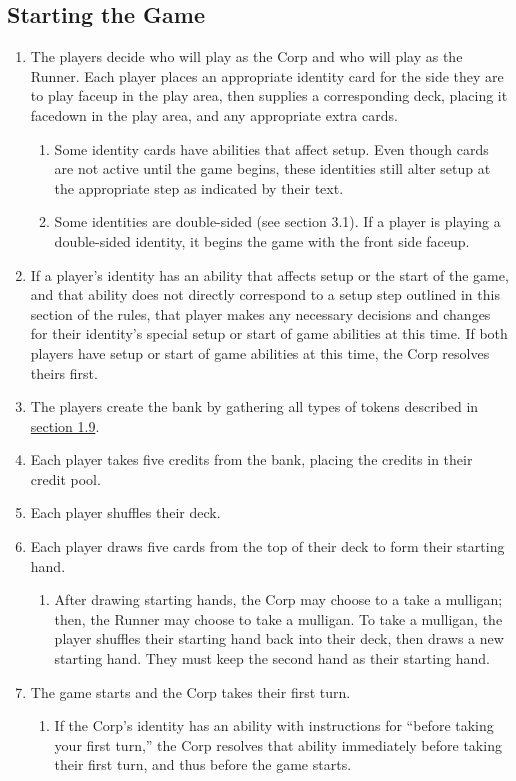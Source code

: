 \subsection{Starting the Game}
\begin{enumerate}
	\item The players decide who will play as the Corp and who will play as the Runner. Each player places an appropriate identity card for the side they are to play faceup in the play area, then supplies a corresponding deck, placing it facedown in the play area, and any appropriate extra cards.
	      \begin{enumerate}
		      \item Some identity cards have abilities that affect setup. Even though cards are not active until the game begins, these identities still alter setup at the appropriate step as indicated by their text.
		      \item \textcolor{Bittersweet}{Some identities are double-sided (see section 3.1). If a player is playing a double-sided identity, it begins the game with the front side faceup.}
	      \end{enumerate}
	\item If a player's identity has an ability that affects setup or the start of the game, and that ability does not directly correspond to a setup step outlined in this section of the rules, that player makes any necessary decisions and changes for their identity's special setup or start of game abilities at this time. If both players have setup or start of game abilities at this time, the Corp resolves theirs first.
	\item The players create the bank by gathering all types of tokens described in \hyperlink{page.i}{section 1.9}.
	\item Each player takes five credits from the bank, placing the credits in their credit pool.
	\item Each player shuffles their deck.
	\item Each player draws five cards from the top of their deck to form their starting hand.
	      \begin{enumerate}
		      \item After drawing starting hands, the Corp may choose to a take a mulligan; then, the Runner may choose to take a mulligan. To take a mulligan, the player shuffles their	starting hand back into their deck, then draws a new starting hand. They must keep the second hand as their starting hand.
	      \end{enumerate}
	\item The game starts and the Corp takes their first turn.
	      \begin{enumerate}
		      \item If the Corp's identity has an ability with instructions for ``before taking your first turn,'' the Corp resolves that ability immediately before taking their first turn, and thus before the game starts.
	      \end{enumerate}
\end{enumerate}
